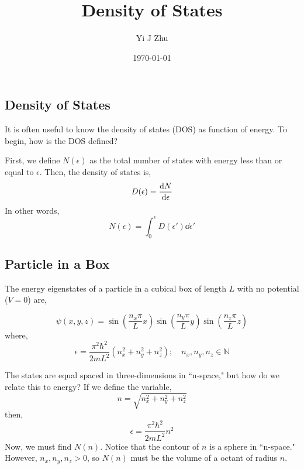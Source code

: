 \documentclass[12pt]{article}
\author{Yi J Zhu}
\title{Density of States}
\date{\today}
\numberwithin{equation}{section}
\begin{document}
\maketitle

\subsection{Density of States}
It is often useful to know the density of states (DOS) as function of energy. To begin, how is the DOS defined?

First, we define $N(\epsilon)$ as the total number of states with energy less than or equal to $\epsilon$. Then, the density of states is,
\begin{equation}
    D(\epsilon) = \dv{N}{\epsilon}
\end{equation}
In other words,
\begin{equation}
    N(\epsilon) = \int_0^\epsilon D(\epsilon')\dd{\epsilon'}
\end{equation}

\subsection{Particle in a Box}

The energy eigenstates of a particle in a cubical box of length $L$ with no potential ($V=0$) are,

\begin{equation}
    \psi(x,y,z) = \sin\left(\frac{n_x\pi}{L}x\right)\sin\left(\frac{n_y\pi}{L}y\right)\sin\left(\frac{n_z\pi}{L}z\right)
\end{equation}
where,
\begin{equation}
    \epsilon = \frac{\pi^2\hbar^2}{2mL^2}(n_x^2 + n_y^2 + n_z^2); \quad n_x, n_y, n_z \in \mathbb{N}
\end{equation}

The states are equal spaced in three-dimensions in ``n-space," but how do we relate this to energy? If we define the variable,
\begin{equation}
    n = \sqrt{n_x^2 + n_y^2 + n_z^2}
    \label{eq:n}
\end{equation}
then,
\begin{equation}
    \epsilon = \frac{\pi^2\hbar^2}{2mL^2} n^2
\end{equation}
Now, we must find $N(n)$. Notice that the contour of $n$ is a sphere in ``n-space." However, $n_x,n_y,n_z>0$, so $N(n)$ must be the volume of a octant of radius $n$.
\end{document}
